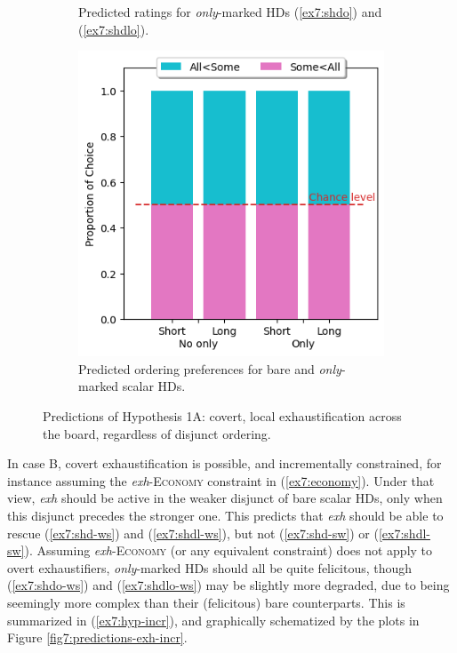 \begin{figure}[H]
\begin{subfigure}[t]{.32\linewidth}
		\caption[]{Predicted ratings for \textit{only}-marked HDs (\ref{ex7:shdo}) and (\ref{ex7:shdlo}).}
	\end{subfigure}
	\hfill
	\begin{subfigure}[t]{.32\linewidth}
		\centering
		\includegraphics[width=\linewidth]{./pred-1a-pref.png}
		\caption[]{Predicted ordering preferences for bare and \textit{only}-marked scalar HDs.}
	\end{subfigure}
	\caption[]{Predictions of Hypothesis 1A: covert, local exhaustification across the board, regardless of disjunct ordering.}\label{fig7:predictions-exh-atb}
\end{figure} 

In case B, covert exhaustification is possible, and incrementally constrained, for instance assuming the \textit{exh}-\textsc{Economy} constraint in (\ref{ex7:economy}). Under that view, \textit{exh} should be active in the weaker disjunct of bare scalar HDs, only when this disjunct precedes the stronger one. This predicts that \textit{exh} should be able to rescue (\ref{ex7:shd-ws}) and (\ref{ex7:shdl-ws}), but not (\ref{ex7:shd-sw}) or (\ref{ex7:shdl-sw}). Assuming \textit{exh}-\textsc{Economy} (or any equivalent constraint) does not apply to overt exhaustifiers, \textit{only}-marked HDs should all be quite felicitous, though (\ref{ex7:shdo-ws}) and (\ref{ex7:shdlo-ws}) may be slightly more degraded, due to being seemingly more complex than their (felicitous) bare counterparts. This is summarized in (\ref{ex7:hyp-incr}), and graphically schematized by the plots in Figure \ref{fig7:predictions-exh-incr}.

